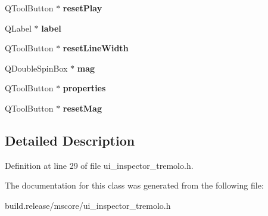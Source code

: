 \begin{DoxyCompactItemize}
Q\+Tool\+Button $\ast$ {\bfseries reset\+Play}
\item 
\mbox{\label{class_ui___inspector_tremolo_bar_aa5e8f154af46f5ad858ee11bd822189e}} 
Q\+Label $\ast$ {\bfseries label}
\item 
\mbox{\label{class_ui___inspector_tremolo_bar_a7fd1b07fe2dd34b1afcae521d923fe9a}} 
Q\+Tool\+Button $\ast$ {\bfseries reset\+Line\+Width}
\item 
\mbox{\label{class_ui___inspector_tremolo_bar_af9ef074c689a6b25b1b4d33ff68f17f2}} 
Q\+Double\+Spin\+Box $\ast$ {\bfseries mag}
\item 
\mbox{\label{class_ui___inspector_tremolo_bar_aaf43a3ec26a8c915afeadcd20ec21958}} 
Q\+Tool\+Button $\ast$ {\bfseries properties}
\item 
\mbox{\label{class_ui___inspector_tremolo_bar_aafe99ae7402902e747ed31ddb92e0c84}} 
Q\+Tool\+Button $\ast$ {\bfseries reset\+Mag}
\end{DoxyCompactItemize}


\subsection{Detailed Description}


Definition at line 29 of file ui\+\_\+inspector\+\_\+tremolo.\+h.



The documentation for this class was generated from the following file\+:\begin{DoxyCompactItemize}
\item 
build.\+release/mscore/ui\+\_\+inspector\+\_\+tremolo.\+h\end{DoxyCompactItemize}
